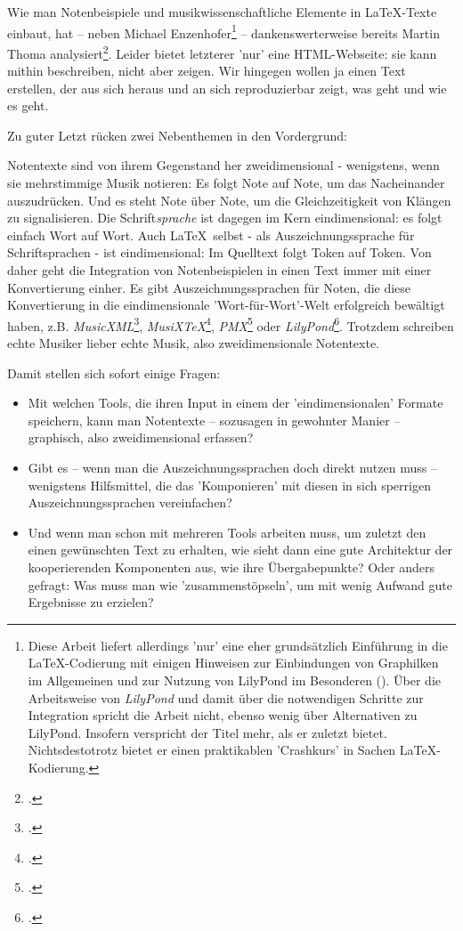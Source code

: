 Wie man Notenbeispiele und musikwissenschaftliche Elemente in \LaTeX-Texte
einbaut, hat -- neben Michael Enzenhofer\footnote{Diese Arbeit liefert
allerdings 'nur' eine eher grundsätzlich Einführung in die \LaTeX-Co\-die\-rung mit
einigen Hinweisen zur Einbindungen von Graphilken im Allgemeinen und zur Nutzung
von LilyPond im Besonderen (\cite[vgl. dazu][4ff, 31ff u.
21ff]{Enzenhofer2016a}). Über die Arbeitsweise von \textit{LilyPond} und damit
über die notwendigen Schritte zur Integration spricht die Arbeit nicht, ebenso
wenig über Alternativen zu LilyPond. Insofern verspricht der Titel mehr, als er
zuletzt bietet. Nichtsdestotrotz bietet er einen praktikablen 'Crashkurs' in
Sachen \LaTeX-Kodierung.} -- dankenswerterweise bereits Martin Thoma
analysiert\footcite[vgl.][\nopage wp]{Thoma2018a}. Leider bietet letzterer 'nur'
eine HTML-Webseite: sie kann mithin beschreiben, nicht aber zeigen.
Wir hingegen wollen ja einen Text erstellen, der aus sich heraus und an sich
reproduzierbar zeigt, was geht und wie es geht.

Zu guter Letzt rücken zwei Nebenthemen in den Vordergrund:

Notentexte sind von ihrem Gegenstand her zweidimensional - wenigstens, wenn sie
mehrstimmige Musik notieren: Es folgt Note auf Note, um das Nacheinander
auszudrücken. Und es steht Note über Note, um die Gleichzeitigkeit von Klängen
zu signalisieren. Die Schrift\textit{sprache} ist dagegen im Kern eindimensional:
es folgt einfach Wort auf Wort. Auch \LaTeX\ selbst - als Auszeichnungssprache
für Schriftsprachen - ist eindimensional: Im Quelltext folgt Token auf Token.
Von daher geht die Integration von Notenbeispielen in einen Text immer mit einer
Konvertierung einher. Es gibt Auszeichnungssprachen für Noten, die diese
Konvertierung in die eindimensionale 'Wort-für-Wort'-Welt erfolgreich bewältigt
haben, z.B. \textit{MusicXML}\footcite[vgl.][\nopage wp]{MusicXML2018a},
\textit{MusiX\TeX}\footcite[vgl.][\nopage wp]{CtanMusixTex2018a},
\textit{PMX}\footcite[vgl.][\nopage wp]{CtanPmx2018a} oder
\textit{LilyPond}\footcite[vgl.][\nopage wp]{LilyPond2018a}. Trotzdem schreiben
echte Musiker lieber echte Musik, also zweidimensionale Notentexte.

Damit stellen sich sofort einige Fragen:

\begin{itemize}
  \item Mit welchen Tools, die ihren Input in einem der 'eindimensionalen'
  Formate speichern, kann man Notentexte -- sozusagen in gewohnter Manier
  -- graphisch, also zweidimensional erfassen?
  \item Gibt es -- wenn man die Auszeichnungssprachen doch direkt nutzen muss --
  wenigstens Hilfsmittel, die das 'Komponieren' mit diesen in sich sperrigen
  Auszeichnungssprachen vereinfachen?
  \item Und wenn man schon mit mehreren Tools arbeiten muss, um zuletzt den
  einen gewünschten Text zu erhalten, wie sieht dann eine gute Architektur der
  kooperierenden Komponenten aus, wie ihre Übergabepunkte? Oder anders gefragt:
  Was muss man wie 'zusammenstöpseln', um mit wenig Aufwand gute Ergebnisse zu
  erzielen?
\end{itemize}

